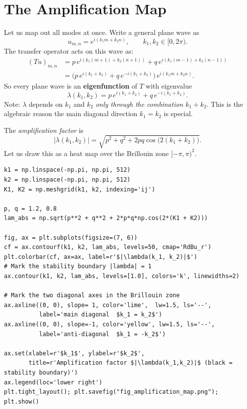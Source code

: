 \documentclass[11pt]{article}
\begin{document}
\section*{The Amplification Map}

\noindent
Let us map out all modes at once.  Write a general plane wave as
\[
  u_{m,n} = e^{i(k_1 m + k_2 n)}, \qquad k_1, k_2 \in [0, 2\pi).
\]
The transfer operator acts on this wave as:
\begin{align*}
  (Tu)_{m,n}
  &= p\,e^{i(k_1(m+1)+k_2(n+1))} + q\,e^{i(k_1(m-1)+k_2(n-1))} \\
  &= \bigl(p\,e^{i(k_1+k_2)} + q\,e^{-i(k_1+k_2)}\bigr)\,e^{i(k_1 m+k_2 n)}.
\end{align*}
So every plane wave is an \textbf{eigenfunction} of $T$ with eigenvalue
\begin{equation}\label{eq:lam}
  \lambda(k_1,k_2) = p\,e^{i(k_1+k_2)} + q\,e^{-i(k_1+k_2)}.
\end{equation}
Note: $\lambda$ depends on $k_1$ and $k_2$ \emph{only through the
combination $k_1 + k_2$}.  This is the algebraic reason the main
diagonal direction $k_1 = k_2$ is special.

\medskip\noindent
The \emph{amplification factor} is
\[
  |\lambda(k_1,k_2)| = \sqrt{p^2 + q^2 + 2pq\cos\bigl(2(k_1+k_2)\bigr)}.
\]
Let us draw this as a heat map over the Brillouin zone
$[-\pi,\pi)^2$.

\begin{lstlisting}
k1 = np.linspace(-np.pi, np.pi, 512)
k2 = np.linspace(-np.pi, np.pi, 512)
K1, K2 = np.meshgrid(k1, k2, indexing='ij')

p, q = 1.2, 0.8
lam_abs = np.sqrt(p**2 + q**2 + 2*p*q*np.cos(2*(K1 + K2)))

fig, ax = plt.subplots(figsize=(7, 6))
cf = ax.contourf(k1, k2, lam_abs, levels=50, cmap='RdBu_r')
plt.colorbar(cf, ax=ax, label=r'$|\lambda(k_1, k_2)|$')
# Mark the stability boundary |lambda| = 1
ax.contour(k1, k2, lam_abs, levels=[1.0], colors='k', linewidths=2)

# Mark the two diagonal axes in the Brillouin zone
ax.axline((0, 0), slope= 1, color='lime',  lw=1.5, ls='--',
          label='main diagonal  $k_1 = k_2$')
ax.axline((0, 0), slope=-1, color='yellow', lw=1.5, ls='--',
          label='anti-diagonal  $k_1 = -k_2$')

ax.set(xlabel=r'$k_1$', ylabel=r'$k_2$',
       title=r'Amplification factor $|\lambda(k_1,k_2)|$ (black = stability boundary)')
ax.legend(loc='lower right')
plt.tight_layout(); plt.savefig("fig_amplification_map.png"); plt.show()
\end{lstlisting}
\end{document}
